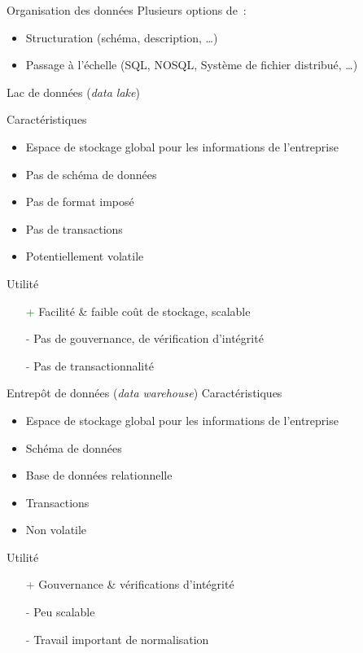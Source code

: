 \begin{frame}{Organisation des données}
  Plusieurs options de~:
  \begin{itemize}
    \item Structuration (schéma, description, …)
    \item Passage à l'échelle (SQL, NOSQL, Système de fichier distribué, …)
  \end{itemize}
\end{frame}

\begin{frame}{Lac de données (\textit{data lake})}

  Caractéristiques

  \begin{itemize}
    \item Espace de stockage global pour les informations de l'entreprise
    \item Pas de schéma de données
    \item Pas de format imposé
    \item Pas de transactions
    \item Potentiellement volatile
  \end{itemize}

  Utilité

  \begin{itemize}
    \item[\textcolor{green}{+}] Facilité \& faible coût de stockage, scalable
    \item[\textcolor{red}{-}] Pas de gouvernance, de vérification d'intégrité
    \item[\textcolor{red}{-}] Pas de transactionnalité
  \end{itemize}
\end{frame}

\begin{frame}{Entrepôt de données (\textit{data warehouse})}
  Caractéristiques

  \begin{itemize}
    \item Espace de stockage global pour les informations de l'entreprise
    \item Schéma de données
    \item Base de données relationnelle
    \item Transactions
    \item Non volatile
  \end{itemize}

  Utilité

  \begin{itemize}
    \item[\textcolor{green}{+}] Gouvernance \& vérifications d'intégrité
    \item[\textcolor{red}{-}] Peu scalable
    \item[\textcolor{red}{-}] Travail important de normalisation
  \end{itemize}
\end{frame}

